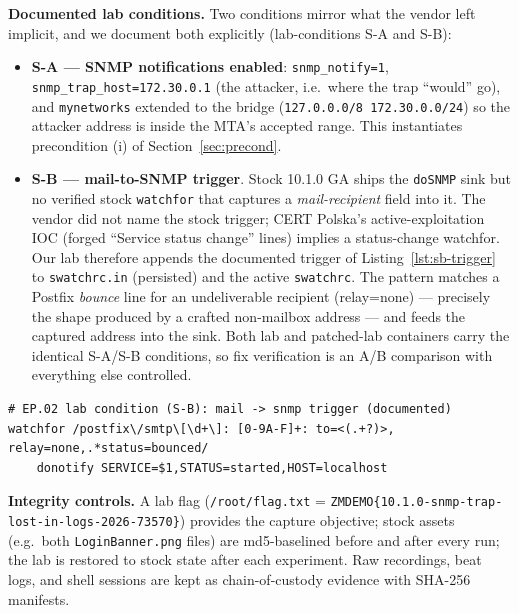\textbf{Documented lab conditions.} Two conditions mirror what the vendor
left implicit, and we document both explicitly (lab-conditions S-A and S-B):
\begin{itemize}
\item \textbf{S-A — SNMP notifications enabled}: \texttt{snmp\_notify=1},
\texttt{snmp\_trap\_host=172.30.0.1} (the attacker, i.e.\ where the trap
``would'' go), and \texttt{mynetworks} extended to the bridge
(\texttt{127.0.0.0/8 172.30.0.0/24}) so the attacker address is inside the
MTA's accepted range. This instantiates precondition (i) of
Section~\ref{sec:precond}.
\item \textbf{S-B — mail-to-SNMP trigger}. Stock 10.1.0 GA ships the
\texttt{doSNMP} sink but no verified stock \texttt{watchfor} that captures a
\emph{mail-recipient} field into it. The vendor did not name the stock
trigger; CERT Polska's active-exploitation IOC (forged ``Service status
change'' lines) implies a status-change watchfor. Our lab therefore appends
the documented trigger of Listing~\ref{lst:sb-trigger} to
\texttt{swatchrc.in} (persisted) and the active \texttt{swatchrc}. The
pattern matches a Postfix \emph{bounce} line for an undeliverable recipient
(relay=none) — precisely the shape produced by a crafted non-mailbox
address — and feeds the captured address into the sink. Both lab and
patched-lab containers carry the identical S-A/S-B conditions, so fix
verification is an A/B comparison with everything else controlled.
\end{itemize}

\begin{lstlisting}[style=shell,label={lst:sb-trigger},caption={Lab condition S-B: the mail-to-SNMP trigger appended to \texttt{swatchrc.in} and \texttt{swatchrc}}]
# EP.02 lab condition (S-B): mail -> snmp trigger (documented)
watchfor /postfix\/smtp\[\d+\]: [0-9A-F]+: to=<(.+?)>, relay=none,.*status=bounced/
    donotify SERVICE=$1,STATUS=started,HOST=localhost
\end{lstlisting}

\textbf{Integrity controls.} A lab flag
(\texttt{/root/flag.txt} =
\texttt{ZMDEMO\{10.1.0-snmp-\hspace{0pt}trap-lost-in-logs-\hspace{0pt}2026-73570\}}) provides the
capture objective; stock assets (e.g.\ both \texttt{LoginBanner.png} files)
are md5-baselined before and after every run; the lab is restored to stock
state after each experiment. Raw recordings, beat logs, and shell sessions
are kept as chain-of-custody evidence with SHA-256 manifests.

